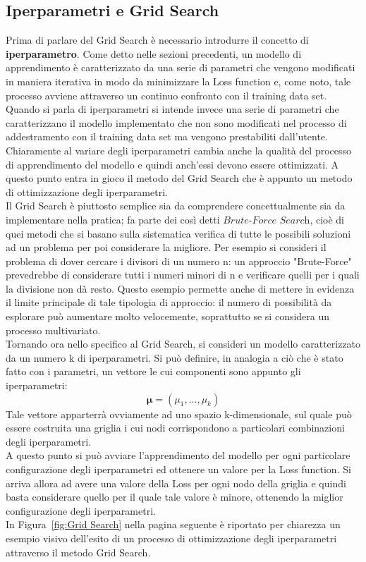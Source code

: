 \newpage

\subsection{Iperparametri e Grid Search}
\label{iperparametri e grid search}

Prima di parlare del Grid Search è necessario introdurre il concetto di \textbf{iperparametro}. Come detto nelle sezioni precedenti, un modello di apprendimento è caratterizzato da una serie di parametri che vengono modificati in maniera iterativa in modo da minimizzare la Loss function e, come noto, tale processo avviene attraverso un continuo confronto con il training data set. Quando si parla di iperparametri si intende invece una serie di parametri che caratterizzano il modello implementato che non sono modificati nel processo di addestramento con il training data set ma vengono prestabiliti dall'utente. \\
Chiaramente al variare degli iperparametri cambia anche la qualità del processo di apprendimento del modello e quindi anch'essi devono essere ottimizzati. A questo punto entra in gioco il metodo del Grid Search che è appunto un metodo di ottimizzazione degli iperparametri. \\
Il Grid Search è piuttosto semplice sia da comprendere concettualmente sia da implementare nella pratica; fa parte dei così detti $\textit{Brute-Force Search}$, cioè di quei metodi che si basano sulla sistematica verifica di tutte le possibili soluzioni ad un problema per poi considerare la migliore. Per esempio si consideri il problema di dover cercare i divisori di un numero n: un approccio "Brute-Force" prevedrebbe di considerare tutti i numeri minori di n e verificare quelli per i quali la divisione non dà resto. Questo esempio permette anche di mettere in evidenza il limite principale di tale tipologia di approccio: il numero di possibilità da esplorare può aumentare molto velocemente, soprattutto se si considera un processo multivariato. \\
Tornando ora nello specifico al Grid Search, si consideri un modello caratterizzato da un numero k di iperparametri. Si può definire, in analogia a ciò che è stato fatto con i parametri, un vettore le cui componenti sono appunto gli iperparametri: 
\begin{equation}
\bm{\mu} = (\mu_1,...,\mu_k)
\end{equation}
Tale vettore apparterrà ovviamente ad uno spazio k-dimensionale, sul quale può essere costruita una griglia i cui nodi corrispondono a particolari combinazioni degli iperparametri. \\
A questo punto si può avviare l'apprendimento del modello per ogni particolare configurazione degli iperparametri ed ottenere un valore per la Loss function. Si arriva allora ad avere una valore della Loss per ogni nodo della griglia e quindi basta considerare quello per il quale tale valore è minore, ottenendo la miglior configurazione degli iperparametri. \\
In Figura~\ref{fig:Grid Search} nella pagina seguente è riportato per chiarezza un esempio visivo dell'esito di un processo di ottimizzazione degli iperparametri attraverso il metodo Grid Search.

